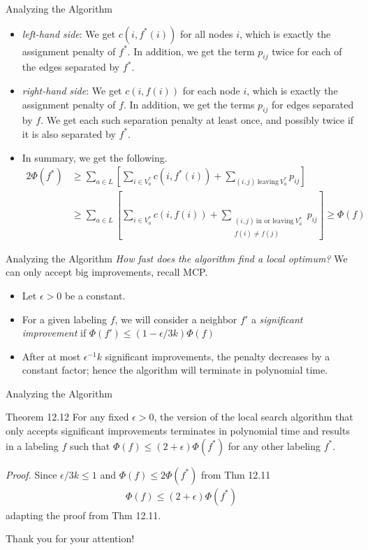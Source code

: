 \documentclass[10pt]{beamer}
\begin{document}
\begin{frame}{Analyzing the Algorithm}
	\begin{itemize}
		\item \textit{left-hand side}: We get $c(i, f^*(i))$ for all nodes $i$, which is exactly the assignment penalty of $f^*$. In addition, we get the term $p_{ij}$ twice for each of the edges separated by $f^*$.
		\item \textit{right-hand side}: We get $c(i, f(i))$ for each node $i$, which is exactly the assignment penalty of $f$. In addition, we get the terms $p_{ij}$ for edges separated by $f$. We get each such separation penalty at least once, and possibly twice if it is also separated by $f^*$.
		\item In summary, we get the following.
		\begin{align*}
		2\Phi(f^*) &\geq \sum_{a \in L} \left\lbrack \sum_{i \in V_a^*} c(i, f^*(i)) + \sum_{(i, j)\: \text{leaving}\: V_a^*} p_{ij} \right\rbrack\\
		&\geq \sum_{a \in L} \left\lbrack \sum_{i \in V_a^*} c(i, f(i)) + \sum_{\substack{(i, j)\: \text{in or leaving}\: V_a^* \\ f(i)\neq f(j)}} p_{ij} \right\rbrack \geq \Phi(f)
		\end{align*}
	\end{itemize}
\end{frame}

\begin{frame}{Analyzing the Algorithm}
	\textit{How fast does the algorithm find a local optimum?} We can only accept big improvements, recall MCP.
	\begin{itemize}
		\item Let $\epsilon > 0$ be a constant.
		\item For a given labeling $f$, we will consider a neighbor $f'$ a \textit{significant improvement} if $\Phi(f') \leq (1-\epsilon/3k) \Phi(f)$
		\item After at most $\epsilon^{-1}k$ significant improvements, the penalty decreases by a constant factor; hence the algorithm will terminate in polynomial time.
	\end{itemize}
\end{frame}

\begin{frame}{Analyzing the Algorithm}
	\begin{block}{Theorem 12.12}
		For any fixed $\epsilon > 0$, the version of the local search algorithm that only accepts significant improvements terminates in polynomial time and results in a labeling $f$ such that $\Phi(f) \leq (2 + \epsilon)\Phi(f^*)$ for any other labeling $f^*$.
	\end{block}
	\textit{Proof.} Since $\epsilon/3k \leq 1$ and $\Phi(f) \leq 2\Phi(f^*)$ from Thm 12.11
	\begin{align*}
	\Phi(f) \leq (2 + \epsilon) \Phi(f^*)
	\end{align*}
	adapting the proof from Thm 12.11.
\end{frame}

\begin{frame}
	\begin{block}{
			\centering
			Thank you for your attention!}
	\end{block}
\end{frame}
\end{document}
